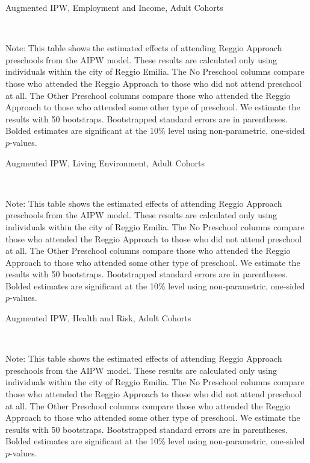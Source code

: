 \begin{landscape}
\begin{table}[H] \caption{Augmented IPW, Employment and Income, Adult Cohorts} \label{ipw-adult-W}
	
	\vspace{1ex} \\
\footnotesize\raggedright{Note: This table shows the estimated effects of attending Reggio Approach preschools from the AIPW model. These results are calculated only using individuals within the city of Reggio Emilia. The No Preschool columns compare those who attended the Reggio Approach to those who did not attend preschool at all. The Other Preschool columns compare those who attended the Reggio Approach to those who attended some other type of preschool. We estimate the results with 50 bootstraps. Bootstrapped standard errors are in parentheses. Bolded estimates are significant at the 10\% level using non-parametric, one-sided $p$-values.}
\end{table}

\begin{table}[H] \caption{Augmented IPW, Living Environment, Adult Cohorts} \label{ipw-adult-L}
	
	\vspace{1ex} \\
\footnotesize\raggedright{Note: This table shows the estimated effects of attending Reggio Approach preschools from the AIPW model. These results are calculated only using individuals within the city of Reggio Emilia. The No Preschool columns compare those who attended the Reggio Approach to those who did not attend preschool at all. The Other Preschool columns compare those who attended the Reggio Approach to those who attended some other type of preschool. We estimate the results with 50 bootstraps. Bootstrapped standard errors are in parentheses. Bolded estimates are significant at the 10\% level using non-parametric, one-sided $p$-values.}
\end{table}

\begin{table}[H] \caption{Augmented IPW, Health and Risk, Adult Cohorts} \label{ipw-adult-H}
	
	\vspace{1ex} \\
\footnotesize\raggedright{Note: This table shows the estimated effects of attending Reggio Approach preschools from the AIPW model. These results are calculated only using individuals within the city of Reggio Emilia. The No Preschool columns compare those who attended the Reggio Approach to those who did not attend preschool at all. The Other Preschool columns compare those who attended the Reggio Approach to those who attended some other type of preschool. We estimate the results with 50 bootstraps. Bootstrapped standard errors are in parentheses. Bolded estimates are significant at the 10\% level using non-parametric, one-sided $p$-values.}
\end{table}


\end{landscape}
